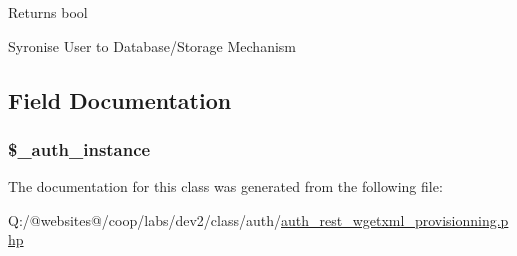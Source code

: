 \begin{DoxyReturn}{Returns}
bool 
\end{DoxyReturn}
Syronise User to Database/\-Storage Mechanism

\subsection{Field Documentation}
\hypertarget{class_xortify_auth_rest___wgetxml_provisionning_a486ed878bb5a7188c99ac4c9ee46ac6e}{
\subsubsection[{\$\-\_\-auth\-\_\-instance}]{\setlength{\rightskip}{0pt plus 5cm}\$\-\_\-auth\-\_\-instance}}\label{class_xortify_auth_rest___wgetxml_provisionning_a486ed878bb5a7188c99ac4c9ee46ac6e}


The documentation for this class was generated from the following file\-:\begin{DoxyCompactItemize}
\item 
Q\-:/@websites@/coop/labs/dev2/class/auth/\hyperlink{auth__rest__wgetxml__provisionning_8php}{auth\-\_\-rest\-\_\-wgetxml\-\_\-provisionning.\-php}\end{DoxyCompactItemize}
